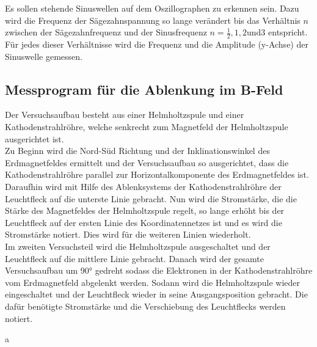 Es sollen stehende Sinuswellen auf dem Oszillographen zu erkennen sein. Dazu wird die Frequenz der Sägezahnspannung so lange verändert bis das Verhältnis $n$ zwischen der Sägezahnfrequenz und der Sinusfrequenz $n = \frac{1}{2}, 1, 2 \text{und} 3$ entspricht. Für jedes dieser Verhältnisse wird die Frequenz und die Amplitude (y-Achse) der Sinuswelle gemessen.

\subsection{Messprogram für die Ablenkung im B-Feld}
Der Versuchsaufbau besteht aus einer Helmholtzspule und einer Kathodenstrahlröhre, welche senkrecht zum Magnetfeld der Helmholtzspule ausgerichtet ist. \\
Zu Beginn wird die Nord-Süd Richtung und der Inklinationswinkel des Erdmagnetfeldes ermittelt und der Versuchsaufbau so ausgerichtet, dass die Kathodenstrahlröhre parallel zur Horizontalkomponente des Erdmagnetfeldes ist. Daraufhin wird mit Hilfe des Ablenksystems der Kathodenstrahlröhre der Leuchtfleck auf die unterste Linie gebracht. Nun wird die Stromstärke, die die Stärke des Magnetfeldes der Helmholtzspule regelt, so lange erhöht bis der Leuchtfleck auf der ersten Linie des Koordinatennetzes ist und es wird die Stromstärke notiert. Dies wird für die weiteren Linien wiederholt. \\
Im zweiten Versuchsteil wird die Helmholtzspule ausgeschaltet und der Leuchtfleck auf die mittlere Linie gebracht. Danach wird der gesamte Versuchsaufbau um 90° gedreht sodass die Elektronen in der Kathodenstrahlröhre vom Erdmagnetfeld abgelenkt werden. Sodann wird die Helmholtzspule wieder eingeschaltet und der Leuchtfleck wieder in seine Ausgangsposition gebracht. Die dafür benötigte Stromstärke und die Verschiebung des Leuchtflecks werden notiert.





















a
